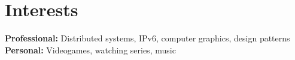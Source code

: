\documentclass[]{friggeri-cv} %
\begin{document}

\section{Interests}

\textbf{Professional:} Distributed systems, IPv6, computer graphics, design patterns\\
\textbf{Personal:} Videogames, watching series, music
\end{document}
